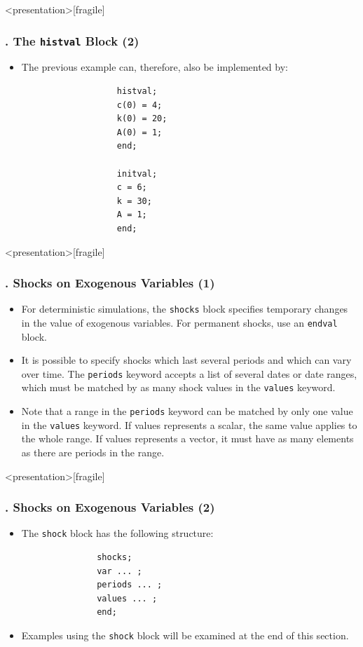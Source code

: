 \documentclass[11pt,aspectratio=169]{beamer}
\begin{document}
\begin{frame}<presentation>[fragile]
	\frametitle{{\thesection.\thesubsection\thinspace\thesubsubsection} The \texttt{histval} Block (2)}
	\begin{itemize}
		\item The previous example can, therefore, also be implemented by:
			\begin{verbatim}
				   histval;
				   c(0) = 4;
				   k(0) = 20;
				   A(0) = 1;
				   end;
				
				   initval;
				   c = 6;
				   k = 30;
				   A = 1;
				   end;
			\end{verbatim}
	\end{itemize}
\end{frame}
\begin{frame}<presentation>[fragile]
	\frametitle{{\thesection.\thesubsection\thinspace\thesubsubsection} Shocks on Exogenous Variables (1)}
	\begin{itemize}
		\item For deterministic simulations, the \texttt{shocks} block specifies temporary changes in the value of exogenous variables. For permanent shocks, use an \texttt{endval} block.
		\item It is possible to specify shocks which last several periods and which can vary over time.  The \texttt{periods} keyword accepts a list of several dates or date ranges, which must be matched by as many shock values in the \texttt{values} keyword. 
		\item Note that a range in the \texttt{periods} keyword can be matched by only one value in the \texttt{values} keyword.  If values represents a scalar, the same value applies to the whole range.  If values represents a vector, it must have as many elements as there are periods in the range.
	\end{itemize}
\end{frame}
\begin{frame}<presentation>[fragile]
	\frametitle{{\thesection.\thesubsection\thinspace\thesubsubsection} Shocks on Exogenous Variables (2)}
	\begin{itemize}
		\item The \texttt{shock} block has the following structure:
			\begin{verbatim}
			   shocks;
			   var ... ;
			   periods ... ;
			   values ... ;
			   end;
			\end{verbatim}
		\item Examples using the \texttt{shock} block will be examined at the end of this section.
	\end{itemize}
\end{frame}
\end{document}
